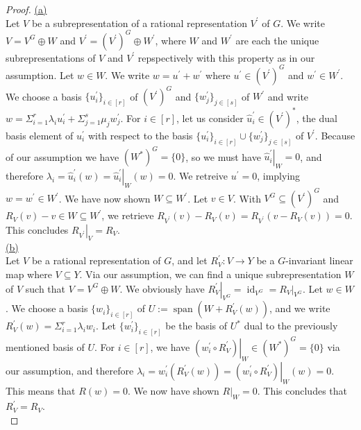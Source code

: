 \begin{proof}
  \hfill \break
  \underline{(a)}\\
  Let $V$ be a subrepresentation of a rational representation $V^\prime$ of $G$.
  We write $V = V^G \oplus W$ and $V^\prime = (V^\prime)^G \oplus W^\prime$, where $W$ and $W^\prime$ are each the unique subrepresentations of $V$ and $V^\prime$ repspectively with this property as in our assumption.
  Let $w \in W$.
  We write $w = u^\prime + w^\prime$ where $u^\prime \in (V^\prime)^G$ and $w^\prime \in W^\prime$.
  We choose a basis $\{u^\prime_i\}_{i \in [r]}$ of $(V^\prime)^G$ and $\{w^\prime_j\}_{j \in [s]}$ of $W^\prime$ and write $w = \Sigma_{i=1}^r \lambda_i u^\prime_i + \Sigma_{j=1}^s \mu_j w^\prime_j$.
  For $i \in [r]$, let us consider $\hat{u}^\prime_i \in (V^\prime)^\ast$, the dual basis element of $u^\prime_i$ with respect to the basis $\{u^\prime_i\}_{i \in [r]} \cup \{w^\prime_j\}_{j \in [s]}$ of $V^\prime$.
  Because of our assumption we have $(W^\ast)^G = \{0\}$, so we must have $\left. \hat{u}^\prime_i \right|_W = 0$, and therefore $\lambda_i = \hat{u}^\prime_i (w) = \left. \hat{u}^\prime_i \right|_W (w) = 0$.
  We retreive $u^\prime = 0$, implying $ w  = w^\prime \in W^\prime $.
  We have now shown $W \subseteq W^\prime$.
  Let $v \in V$.
  With $V^G \subseteq (V^\prime)^G$ and $R_V (v) - v \in W \subseteq W^\prime$, we retrieve $R_{V^\prime}(v) - R_V (v) = R_{V^\prime}(v - R_V(v)) = 0$.
  This concludes $\left. R_{V^\prime} \right|_V = R_V$.  \\
  \underline{(b)}\\
  Let $V$ be a rational representation of $G$, and let $R^\prime_V \colon V \rightarrow Y$ be a $G$-invariant linear map where $V \subseteq Y$.
  Via our assumption, we can find a unique subrepresentation $W$ of $V$ such that $V = V^G \oplus W$.
  We obviously have $\left. R^\prime_V \right|_{V^G} = \operatorname{id}_{V^G} = \left. R_V \right|_{V^G}$.
  Let $w \in W$.
  We choose a basis $\{w_i\}_{i \in [r]}$ of $U:= \operatorname{span}(W + R^\prime_V (w))$, and we write $R^\prime_V (w) = \Sigma_{i=1}^r \lambda_i w_i$.
  Let $\{w^\prime_i\}_{i \in [r]}$ be the basis of $U^\ast$ dual to the previously mentioned basis of $U$.
  For $i \in [r]$, we have $\left. (w^\prime_i \circ R^\prime_V) \right|_W \in (W^\ast)^G = \{0\}$ via our assumption, and therefore $ \lambda_i = w^\prime_i (R^\prime_V(w)) = \left. (w^\prime_i \circ R^\prime_V) \right|_W (w) = 0$.
  This means that $R(w) = 0$.
  We now have shown $\left. R \right|_{W} = 0$.
  This concludes that $R^\prime_V = R_V$.  \\

\end{proof}
